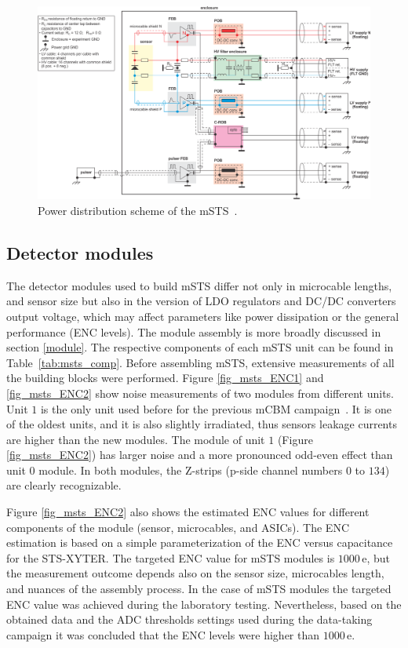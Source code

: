 \begin{figure}[!h]
\centering
\includegraphics[width=0.95\columnwidth]{Chapter6/DCS/images/power_distribution.png}
\caption{Power distribution scheme of the \gls{mSTS}~\cite{Lymanets}.}
\label{fig_msts_power}
\end{figure}

\subsection{Detector modules}
 The detector modules used to build \gls{mSTS} differ not only in microcable lengths, and sensor size but also in the version of \gls{LDO} regulators and DC/DC converters output voltage, which may affect parameters like power dissipation or the general performance (ENC levels). The module assembly is more broadly discussed in section \ref{module}. The respective components of each \gls{mSTS} unit can be found in Table~\ref{tab:msts_comp}. Before assembling \gls{mSTS}, extensive measurements of all the building blocks were performed. Figure \ref{fig_msts_ENC1} and  \ref{fig_msts_ENC2} show noise measurements of two modules from different units. Unit $1$ is the only unit used before for the previous \gls{mCBM} campaign~\cite{heuser1}. It is one of the oldest units, and it is also slightly irradiated, thus sensors leakage currents are higher than the new modules. The module of unit $1$ (Figure \ref{fig_msts_ENC2}) has larger noise and a more pronounced odd-even effect than unit $0$ module. In both modules, the Z-strips (p-side channel numbers $0$ to $134$) are clearly recognizable. 

Figure \ref{fig_msts_ENC2} also shows the estimated ENC values for different components of the module (sensor, microcables, and \gls{ASIC}s). The \gls{ENC} estimation is based on a simple parameterization of the \gls{ENC} versus capacitance for the STS-XYTER. The targeted \gls{ENC} value for \gls{mSTS} modules is $1000$\,e, but the measurement outcome depends also on the sensor size, microcables length, and nuances of the assembly process. In the case of \gls{mSTS} modules the targeted \gls{ENC} value was achieved during the laboratory testing. Nevertheless, based on the  obtained data and the \gls{ADC} thresholds settings used during the data-taking campaign it was concluded that the \gls{ENC} levels were higher than $1000$\,e.


